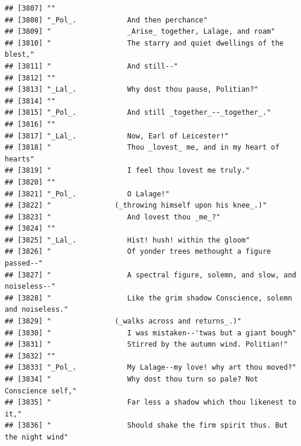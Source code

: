 \documentclass{article}\usepackage[]{graphicx}\usepackage[]{color}
\makeatletter
\newenvironment{kframe}{%
 \def\at@end@of@kframe{}%
 \ifinner\ifhmode%
  \def\at@end@of@kframe{\end{minipage}}%
  \begin{minipage}{\columnwidth}%
 \fi\fi%
 \def\FrameCommand##1{\hskip\@totalleftmargin \hskip-\fboxsep
 \colorbox{shadecolor}{##1}\hskip-\fboxsep
     \hskip-\linewidth \hskip-\@totalleftmargin \hskip\columnwidth}%
 \MakeFramed {\advance\hsize-\width
   \@totalleftmargin\z@ \linewidth\hsize
   \@setminipage}}%
 {\par\unskip\endMakeFramed%
 \at@end@of@kframe}
\newenvironment{knitrout}{}{} %
\makeatother
\begin{document}
\begin{knitrout}
\begin{kframe}
\begin{verbatim}
## [3807] ""                                                                            
## [3808] "_Pol_.            And then perchance"                                        
## [3809] "                  _Arise_ together, Lalage, and roam"                        
## [3810] "                  The starry and quiet dwellings of the blest,"              
## [3811] "                  And still--"                                               
## [3812] ""                                                                            
## [3813] "_Lal_.            Why dost thou pause, Politian?"                            
## [3814] ""                                                                            
## [3815] "_Pol_.            And still _together_--_together_."                         
## [3816] ""                                                                            
## [3817] "_Lal_.            Now, Earl of Leicester!"                                   
## [3818] "                  Thou _lovest_ me, and in my heart of hearts"               
## [3819] "                  I feel thou lovest me truly."                              
## [3820] ""                                                                            
## [3821] "_Pol_.            O Lalage!"                                                 
## [3822] "               (_throwing himself upon his knee_.)"                          
## [3823] "                  And lovest thou _me_?"                                     
## [3824] ""                                                                            
## [3825] "_Lal_.            Hist! hush! within the gloom"                              
## [3826] "                  Of yonder trees methought a figure passed--"               
## [3827] "                  A spectral figure, solemn, and slow, and noiseless--"      
## [3828] "                  Like the grim shadow Conscience, solemn and noiseless."    
## [3829] "               (_walks across and returns_.)"                                
## [3830] "                  I was mistaken--'twas but a giant bough"                   
## [3831] "                  Stirred by the autumn wind. Politian!"                     
## [3832] ""                                                                            
## [3833] "_Pol_.            My Lalage--my love! why art thou moved?"                   
## [3834] "                  Why dost thou turn so pale? Not Conscience self,"          
## [3835] "                  Far less a shadow which thou likenest to it,"              
## [3836] "                  Should shake the firm spirit thus. But the night wind"     

\end{verbatim}
\end{kframe}
\end{knitrout}
\end{document}

